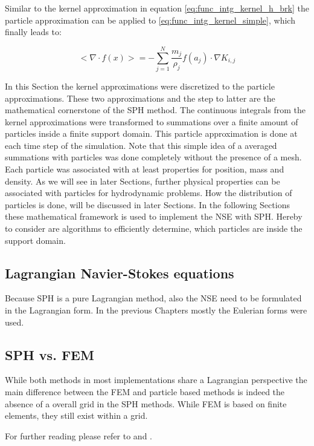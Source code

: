 Similar to the kernel approximation in equation \ref{eq:func_intg_kernel_h_brk} the particle approximation can be applied to \ref{eq:func_intg_kernel_simple}, which finally leads to:

\begin{equation} \label{eq:kernel2_to_part_clean}
< \nabla \cdot f(x) > = 
- \sum_{j=1}^{N} \frac{m_{j}}{\rho_{j}}  f(a_{j}) \cdot \nabla K_{i,j}
\end{equation}

In this Section the kernel approximations were discretized to the particle approximations. These two approximations and the step to latter are the mathematical cornerstone of the SPH method. The continuous integrals from the kernel approximations were transformed to summations over a finite amount of particles inside a finite support domain. This particle approximation is done at each time step of the simulation. Note that this simple idea of a averaged summations with particles was done completely without the presence of a mesh. Each particle was associated with at least properties for position, mass and density. As we will see in later Sections, further physical properties can be associated with particles for hydrodynamic problems. How the distribution of particles is done, will be discussed in later Sections. In the following Sections these mathematical framework is used to implement the NSE with SPH. Hereby to consider are algorithms to efficiently determine, which particles are inside the support domain.



\subsection{Lagrangian Navier-Stokes equations}
Because SPH is a pure Lagrangian method, also the NSE need to be formulated in the Lagrangian form. In the previous Chapters mostly the Eulerian forms were used. 

\subsection{SPH vs. FEM}
While both methods in most implementations share a Lagrangian perspective the main difference between the
FEM and particle based methods is indeed the absence of a overall grid in the SPH methods. While FEM is based
on finite elements, they still exist within a grid.

For further reading please refer to \citep{Li2004} and \citep{Liu2003}.

